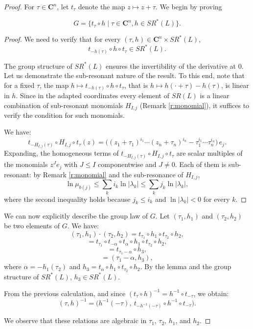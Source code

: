 \documentclass[10pt,a4paper]{amsart}
\newcommand{\C}{\mathbf{C}}
\begin{document}
\begin{proof}
For $\tau \in \C^n$, let $t_\tau$ denote the map $z \mapsto z + \tau$. We begin by proving
\begin{lemma}\label{l:Gform}
\[
G = \{t_\tau \circ h \mid \tau \in \C^n, h \in SR^*(L)\}.
\]
\end{lemma}
\begin{proof}
We need to verify that for every $(\tau, h) \in \C^n \times SR^*(L)$,
\[
t_{-h(\tau)} \circ h \circ t_\tau \in SR^*(L).
\]

The group structure of $SR^*(L)$ ensures the invertibility of the derivative at $0$. Let us demonstrate the sub-resonant nature of the result. To this end, note that for a fixed $\tau$, the map $h\mapsto t_{-h(\tau)}\circ h\circ t_\tau$, that is $h\mapsto h(\cdot+\tau)-h(\tau)$, is linear in $h$. Since in the adapted coordinates every element of $SR(L)$ is a linear combination of sub-resonant monomials $H_{I,j}$ (Remark \ref{r:monomial}), it suffices to verify the condition for such monomials.

We have:
\[
t_{-H_{I,j}(\tau)} \circ H_{I,j} \circ t_\tau (z)
= \big((z_1 + \tau_1)^{i_1} \cdots (z_n + \tau_n)^{i_n} - \tau_1^{i_1} \cdots \tau_n^{i_n}\big)\, e_j .
\]
Expanding, the homogeneous terms of $t_{-H_{I,j}(\tau)} \circ H_{I,j} \circ t_\tau$ are scalar multiples of the monomials $z^J e_j$ with $J\le I$ componentwise and $J\neq0$. Each of them is sub-resonant: by Remark \ref{r:monomial} and the sub-resonance of $H_{I,j}$,
\[
\ln \mu_{b(j)} \leq \sum_k i_k \ln |\lambda_k| \leq \sum_k j_k \ln |\lambda_k|,
\]
where the second inequality holds because $j_k\le i_k$ and $\ln|\lambda_k|<0$ for every $k$.
\end{proof}
We can now explicitly describe the group law of $G$. Let $(\tau_1, h_1)$ and $(\tau_2, h_2)$ be two elements of $G$. We have:
\[
(\tau_1, h_1) \cdot (\tau_2, h_2) = t_{\tau_1} \circ h_1 \circ t_{\tau_2} \circ h_2,
\]
\[
= t_{\tau_1} \circ t_{- \alpha} \circ t_\alpha \circ h_1 \circ t_{\tau_2} \circ h_2,
\]
\[
= t_{\tau_1 - \alpha} \circ h_3,
\]
\[
= (\tau_1 - \alpha, h_3),
\]
where $\alpha = -h_1(\tau_2)$ and $h_3 = t_\alpha \circ h_1 \circ t_{\tau_2} \circ h_2$. By the lemma and the group structure of $SR^*(L)$, $h_3 \in SR^*(L)$.

From the previous calculation, and since $(t_\tau\circ h)^{-1}=h^{-1}\circ t_{-\tau}$, we obtain:
\[
(\tau, h)^{-1} = \big(h^{-1}(-\tau),\ t_{-h^{-1}(-\tau)} \circ h^{-1} \circ t_{-\tau}\big).
\]

We observe that these relations are algebraic in $\tau_1$, $\tau_2$, $h_1$, and $h_2$.
\end{proof}
\end{document}

